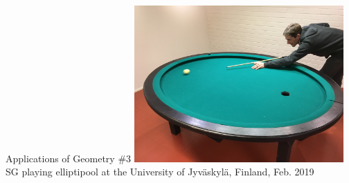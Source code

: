 \documentclass[compress,aspectratio=169,10pt,usenames,dvipsnames]{beamer}
\begin{document}
\begin{frame}
\begin{block}{Applications of Geometry \#3}
\centering
\includegraphics[width=0.6\textwidth]{EllipticPool} \\
SG playing elliptipool at the University of Jyv{\"a}skyl{\"a}, Finland, Feb. 2019
\end{block}
\end{frame}
\end{document}
